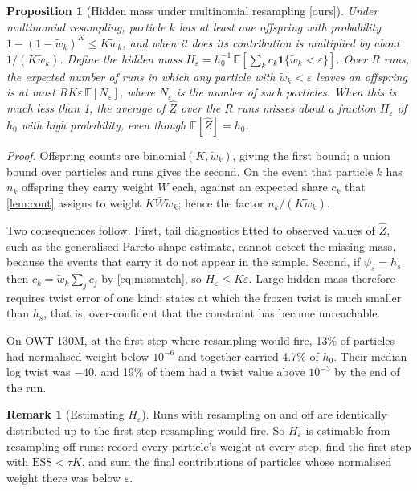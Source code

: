 \documentclass[11pt]{article}
\newtheorem{proposition}[theorem]{Proposition}
\theoremstyle{definition}
\newtheorem{remark}[theorem]{Remark}
\newcommand{\one}{\mathbf{1}}
\newcommand{\E}{\mathbb{E}}
\newcommand{\Zh}{\widehat Z}
\newcommand{\wt}{\tilde w}
\newcommand{\status}[1]{\textsf{\small[#1]}}
\newcommand{\proofref}[1]{\par\noindent\textit{Proof.} #1\par\smallskip}
\begin{document}
\begin{proposition}[Hidden mass under multinomial resampling \status{ours}]\label{prop:hidden}
Under multinomial resampling, particle $k$ has at least one offspring with probability
$1-(1-\wt_k)^K\le K\wt_k$, and when it does its contribution is multiplied by about $1/(K\wt_k)$. Define the
hidden mass $H_\varepsilon=h_0^{-1}\,\E[\sum_kc_k\one\{\wt_k<\varepsilon\}]$. Over $R$ runs, the expected number
of runs in which any particle with $\wt_k<\varepsilon$ leaves an offspring is at most
$RK\varepsilon\,\E[N_\varepsilon]$, where $N_\varepsilon$ is the number of such particles. When this is much less
than 1, the average of $\Zh$ over the $R$ runs misses
about a fraction $H_\varepsilon$ of $h_0$ with high probability, even though $\E[\Zh]=h_0$.
\end{proposition}
\proofref{Offspring counts are binomial$(K,\wt_k)$, giving the first bound; a union bound over particles and runs
gives the second. On the event that particle $k$ has $n_k$ offspring they carry weight $\bar W$ each, against an
expected share $c_k$ that \cref{lem:cont} assigns to weight $K\bar W\wt_k$; hence the factor $n_k/(K\wt_k)$.}

Two consequences follow. First, tail diagnostics fitted to observed values of $\Zh$, such as the
generalised-Pareto shape estimate, cannot detect the missing mass, because the events that carry it do not appear
in the sample. Second, if $\psi_s=h_s$ then $c_k=\wt_k\sum_jc_j$ by \eqref{eq:mismatch}, so
$H_\varepsilon\le K\varepsilon$. Large hidden mass therefore requires twist error of one kind: states at which the
frozen twist is much smaller than $h_s$, that is, over-confident that the constraint has become unreachable.

On OWT-130M, at the first step where resampling would fire, 13\% of particles had normalised weight below
$10^{-6}$ and together carried 4.7\% of $h_0$. Their median log twist was $-40$, and 19\% of them had a twist
value above $10^{-3}$ by the end of the run.

\begin{remark}[Estimating $H_\varepsilon$]
Runs with resampling on and off are identically distributed up to the first step resampling would fire. So
$H_\varepsilon$ is estimable from resampling-off runs: record every particle's weight at every step, find the
first step with $\mathrm{ESS}<\tau K$, and sum the final contributions of particles whose normalised weight there
was below $\varepsilon$.
\end{remark}
\end{document}
